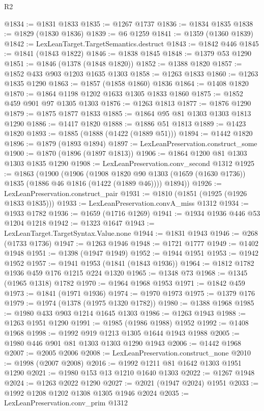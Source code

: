 \begin{lexlean}{R2}
\begin{coremodule}
{{{{{{{{{{{{{{{{{{{{{{{{{{{{{{{{{{{{{{{{{{{{{{@1834 := @1831 @1833
@1835 := @1267 @1737
@1836 := @1834 @1835
@1838 := @1829 (@1830 @1836)
@1839 := @6 @1259
@1841 := @1359 (@1360 @1839)
@1842 := LexLeanTarget.TargetSemantics.destruct
@1843 := @1842 @446
@1845 := @1841 (@1843 @1822)
@1846 := @1838 @1845
@1848 := @1379 @53 @1290
@1851 := @1846 (@1378 (@1848 @1820))
@1852 := @1388 @1820
@1857 := @1852 @433 @903 @1203 @1635 @1303
@1858 := @1263 @1833
@1860 := @1263 @1835 @1290
@1863 := @1857 (@1858 @1860) @1836
@1864 := @1408 @1820
@1870 := @1864 @1198 @1202 @1633 @1305 @1833 @1860
@1875 := @1852 @459 @901 @97 @1305 @1303
@1876 := @1263 @1813
@1877 := @1876 @1290
@1879 := @1875 @1877 @1833
@1885 := @1864 @95 @81 @1303 @1303 @1813 @1290
@1886 := @1417 @1820
@1888 := @1886 @51 @1813
@1889 := @1423 @1820
@1893 := @1885 (@1888 (@1422 (@1889 @51)))
@1894 := @1442 @1820
@1896 := @1879 (@1893 @1894)
@1897 := LexLeanPreservation.construct_some
@1900 := @1870 (@1896 (@1897 @1813))
@1906 := @1864 @1200 @81 @1303 @1303 @1835 @1290
@1908 := LexLeanPreservation.conv_second @1312
@1925 := @1863
    (@1900
      (@1906
        (@1908 @1820 @90 @1303 (@1659 (@1630 @1736)) @1835 (@1886 @46 @1816 (@1422 (@1889 @46))))
        @1894))
@1926 := LexLeanPreservation.construct_pair
@1931 := @1810 (@1851 (@1925 (@1926 @1833 @1835)))
@1933 := LexLeanPreservation.convA_miss @1312
@1934 := @1933 @1782
@1936 := @1659 (@1716 @1269)
@1941 := @1934 @1936 @446 @53 @1204 @1218
@1942 := @1323 @1647
@1943 := LexLeanTarget.TargetSyntax.Value.none
@1944 := @1831 @1943
@1946 := @268 (@1733 @1736)
@1947 := @1263 @1946
@1948 := @1721 @1777
@1949 := @1402 @1948
@1951 := @1398 (@1947 @1949)
@1952 := @1944 @1951
@1953 := @1942 @1952
@1957 := @1941 @1953 (@1841 (@1843 @1936))
@1964 := @1812 @1782 @1936 @459 @176 @1215 @224 @1320
@1965 := @1348 @73
@1968 := @1345 (@1965 @1318) @1782
@1970 := @1964 @1968 @1953
@1971 := @1842 @459
@1973 := @1841 (@1971 @1936)
@1974 := @1970 @1973
@1975 := @1379 @176
@1979 := @1974 (@1378 (@1975 @1320 @1782))
@1980 := @1388 @1968
@1985 := @1980 @433 @903 @1214 @1645 @1303
@1986 := @1263 @1943
@1988 := @1263 @1951 @1290
@1991 := @1985 (@1986 @1988) @1952
@1992 := @1408 @1968
@1998 := @1992 @919 @1213 @1305 @1644 @1943 @1988
@2005 := @1980 @446 @901 @81 @1303 @1303 @1290 @1943
@2006 := @1442 @1968
@2007 := @2005 @2006
@2008 := LexLeanPreservation.construct_none
@2010 := @1998 (@2007 @2008)
@2016 := @1992 @1211 @81 @1642 @1303 @1951 @1290
@2021 := @1980 @153 @13 @1210 @1640 @1303
@2022 := @1267 @1948
@2024 := @1263 @2022 @1290
@2027 := @2021 (@1947 @2024) @1951
@2033 := @1992 @1208 @1202 @1308 @1305 @1946 @2024
@2035 := LexLeanPreservation.conv_prim @1312
}}}}}}}}}}}}}}}}}}}}}}}}}}}}}}}}}}}}}}}}}}}}}}
\end{coremodule}
\end{lexlean}
